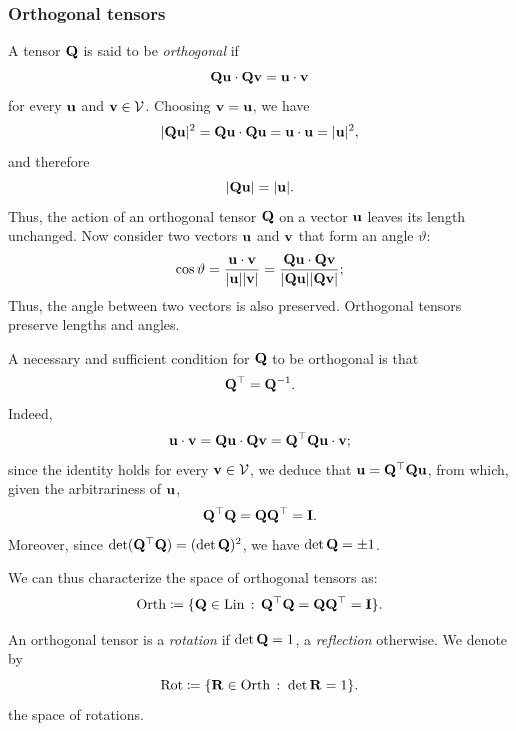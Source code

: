 \subsubsection{Orthogonal tensors}
A tensor $\mathbf{Q}$ is said to be \textit{orthogonal} if 
\begin{equation}
	\mathbf{Q} \mathbf{u} \cdot \mathbf{Q} \mathbf{v} =\mathbf{u} \cdot \mathbf{v}
\end{equation}
for every $\mathbf{u}$ and $\mathbf{v} \in \mathcal{V}$.
Choosing $\mathbf{v} =\mathbf{u}$, we have
\begin{equation}
	|\mathbf{Q} \mathbf{u}|^2 =\mathbf{Q} \mathbf{u}\cdot\mathbf{Q} \mathbf{u} =\mathbf{u} \cdot\mathbf{u} =|\mathbf{u}|^2,
\end{equation}
and therefore
\begin{equation}
	|\mathbf{Q} \mathbf{u}|=|\mathbf{u}|.
\end{equation}
Thus, the action of an orthogonal tensor $\mathbf{Q}$ on a vector $\mathbf{u}$ leaves its length unchanged. Now consider two vectors $\mathbf{u}$ and $\mathbf{v}$ that form an angle $\vartheta$:
\begin{equation}
	\cos\vartheta=\frac{\mathbf{u} \cdot \mathbf{v}}{|\mathbf{u}||\mathbf{v}|}=\frac{\mathbf{Q} \mathbf{u} \cdot \mathbf{Q} \mathbf{v}}{|\mathbf{Q} \mathbf{u} ||\mathbf{Q} \mathbf{v} |};
\end{equation}
Thus, the angle between two vectors is also preserved. Orthogonal tensors preserve lengths and angles.

A necessary and sufficient condition for $\mathbf{Q}$ to be orthogonal is that
\begin{equation}
	\mathbf{Q}^\top = \mathbf{Q} ^{-1}.
\end{equation}
Indeed,
\begin{equation}
	\mathbf{u} \cdot \mathbf{v} =\mathbf{Q} \mathbf{u} \cdot\mathbf{Q} \mathbf{v} =\mathbf{Q} ^\top \mathbf{Q} \mathbf{u} \cdot \mathbf{v};
\end{equation}
since the identity holds for every $\mathbf{v} \in \mathcal{V}$, we deduce that $\mathbf{u} = \mathbf{Q} ^\top \mathbf{Q} \mathbf{u}$, from which, given the arbitrariness of $\mathbf{u}$,
\begin{equation}
	\mathbf{Q} ^\top \mathbf{Q} =\mathbf{Q} \mathbf{Q} ^\top =\mathbf{I}.
\end{equation}
Moreover, since $\det (\mathbf{Q}^\top \mathbf{Q})=(\det \mathbf{Q})^2$, we have $\det \mathbf{Q}=\pm 1$.

We can thus characterize the space of orthogonal tensors as:
\begin{equation}
	\operatorname{Orth}\coloneqq \{\mathbf{Q} \in \operatorname{Lin} \,:\, \mathbf{Q} ^\top \mathbf{Q} =\mathbf{Q} \mathbf{Q} ^\top =\mathbf{I}\}.
\end{equation}

An orthogonal tensor is a \textit{rotation} if $\det \mathbf{Q} =1$, a \textit{reflection} otherwise.
We denote by
\begin{equation}
	\operatorname{\operatorname{Rot}}\coloneqq \{\mathbf{R} \in \operatorname{Orth}\,:\; \det \mathbf{R} =1  \}.
\end{equation}
the space of rotations.

